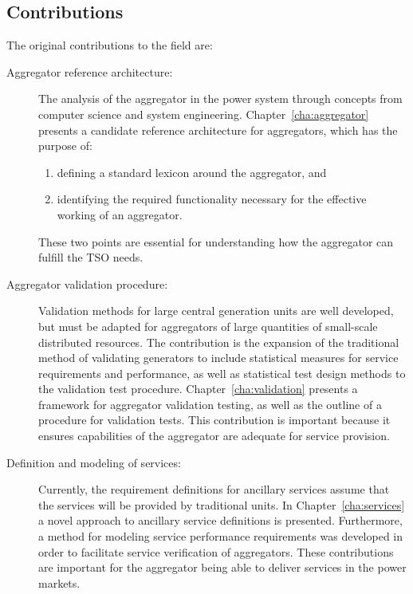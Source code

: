 \subsection*{Contributions}
The original contributions to the field are:
\begin{description}
	\item[Aggregator reference architecture:] The analysis of the aggregator in the power system through concepts from computer science and system engineering. Chapter~\ref{cha:aggregator} presents a candidate reference architecture for aggregators, which has the purpose of:
		\begin{enumerate}
			\item defining a standard lexicon around the aggregator, and
			\item identifying the required functionality necessary for the effective working of an aggregator.
		\end{enumerate}
		These two points are essential for understanding how the aggregator can fulfill the TSO needs.%
	\item[Aggregator validation procedure:] Validation methods for large central generation units are well developed, but must be adapted for aggregators of large quantities of small-scale distributed resources. The contribution is the expansion of the traditional method of validating generators to include statistical measures for service requirements and performance, as well as statistical test design methods to the validation test procedure. Chapter~\ref{cha:validation} presents a framework for aggregator validation testing, as well as the outline of a procedure for validation tests. This contribution is important because it ensures capabilities of the aggregator are adequate for service provision.
	\item[Definition and modeling of services:] Currently, the requirement definitions for ancillary services assume that the services will be provided by traditional units. In Chapter~\ref{cha:services} a novel approach to ancillary service definitions is presented. Furthermore, a method for modeling service performance requirements was developed in order to facilitate service verification of aggregators. These contributions are important for the aggregator being able to deliver services in the power markets.

\end{description}
